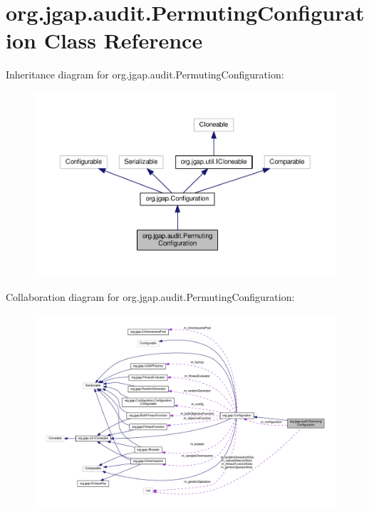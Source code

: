 \hypertarget{classorg_1_1jgap_1_1audit_1_1_permuting_configuration}{\section{org.\-jgap.\-audit.\-Permuting\-Configuration Class Reference}
\label{classorg_1_1jgap_1_1audit_1_1_permuting_configuration}
}


Inheritance diagram for org.\-jgap.\-audit.\-Permuting\-Configuration\-:
\nopagebreak
\begin{figure}[H]
\begin{center}
\leavevmode
\includegraphics[width=350pt]{classorg_1_1jgap_1_1audit_1_1_permuting_configuration__inherit__graph}
\end{center}
\end{figure}


Collaboration diagram for org.\-jgap.\-audit.\-Permuting\-Configuration\-:
\nopagebreak
\begin{figure}[H]
\begin{center}
\leavevmode
\includegraphics[width=350pt]{classorg_1_1jgap_1_1audit_1_1_permuting_configuration__coll__graph}
\end{center}
\end{figure}
